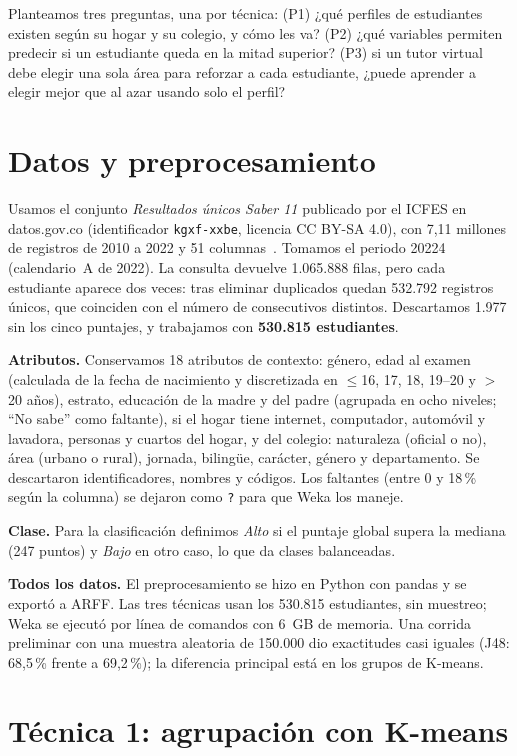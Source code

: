 \documentclass[conference]{IEEEtran}
\begin{document}
Planteamos tres preguntas, una por técnica: (P1) ¿qué perfiles de estudiantes existen según su hogar y su colegio, y cómo les va? (P2) ¿qué variables permiten predecir si un estudiante queda en la mitad superior? (P3) si un tutor virtual debe elegir una sola área para reforzar a cada estudiante, ¿puede aprender a elegir mejor que al azar usando solo el perfil?

\section{Datos y preprocesamiento}
Usamos el conjunto \emph{Resultados únicos Saber 11} publicado por el ICFES en datos.gov.co (identificador \texttt{kgxf-xxbe}, licencia CC BY-SA 4.0), con 7,11 millones de registros de 2010 a 2022 y 51 columnas~\cite{icfes}. Tomamos el periodo 20224 (calendario~A de 2022). La consulta devuelve 1.065.888 filas, pero cada estudiante aparece dos veces: tras eliminar duplicados quedan 532.792 registros únicos, que coinciden con el número de consecutivos distintos. Descartamos 1.977 sin los cinco puntajes, y trabajamos con \textbf{530.815 estudiantes}.

\textbf{Atributos.} Conservamos 18 atributos de contexto: género, edad al examen (calculada de la fecha de nacimiento y discretizada en $\le$16, 17, 18, 19--20 y $>$20 años), estrato, educación de la madre y del padre (agrupada en ocho niveles; ``No sabe'' como faltante), si el hogar tiene internet, computador, automóvil y lavadora, personas y cuartos del hogar, y del colegio: naturaleza (oficial o no), área (urbano o rural), jornada, bilingüe, carácter, género y departamento. Se descartaron identificadores, nombres y códigos. Los faltantes (entre 0 y 18\,\% según la columna) se dejaron como \texttt{?} para que Weka los maneje.

\textbf{Clase.} Para la clasificación definimos \emph{Alto} si el puntaje global supera la mediana (247 puntos) y \emph{Bajo} en otro caso, lo que da clases balanceadas.

\textbf{Todos los datos.} El preprocesamiento se hizo en Python con pandas y se exportó a ARFF. Las tres técnicas usan los 530.815 estudiantes, sin muestreo; Weka se ejecutó por línea de comandos con 6~GB de memoria. Una corrida preliminar con una muestra aleatoria de 150.000 dio exactitudes casi iguales (J48: 68,5\,\% frente a 69,2\,\%); la diferencia principal está en los grupos de K-means.

\section{Técnica 1: agrupación con K-means}
\end{document}
